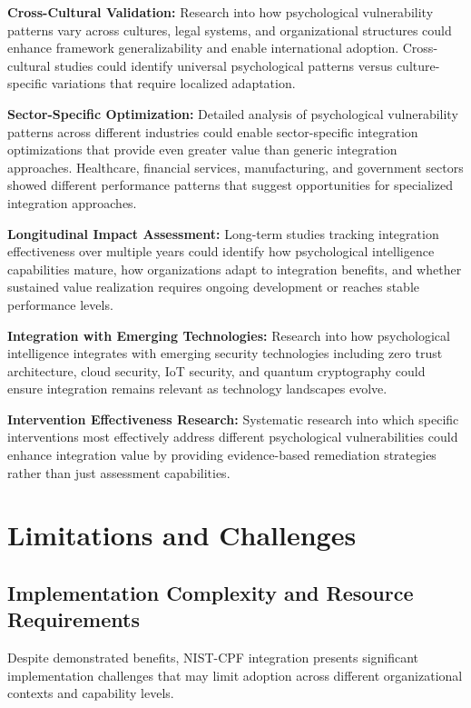 \documentclass[10pt, twocolumn]{article}
\begin{document}
\textbf{Cross-Cultural Validation:} Research into how psychological vulnerability patterns vary across cultures, legal systems, and organizational structures could enhance framework generalizability and enable international adoption. Cross-cultural studies could identify universal psychological patterns versus culture-specific variations that require localized adaptation.

\textbf{Sector-Specific Optimization:} Detailed analysis of psychological vulnerability patterns across different industries could enable sector-specific integration optimizations that provide even greater value than generic integration approaches. Healthcare, financial services, manufacturing, and government sectors showed different performance patterns that suggest opportunities for specialized integration approaches.

\textbf{Longitudinal Impact Assessment:} Long-term studies tracking integration effectiveness over multiple years could identify how psychological intelligence capabilities mature, how organizations adapt to integration benefits, and whether sustained value realization requires ongoing development or reaches stable performance levels.

\textbf{Integration with Emerging Technologies:} Research into how psychological intelligence integrates with emerging security technologies including zero trust architecture, cloud security, IoT security, and quantum cryptography could ensure integration remains relevant as technology landscapes evolve.

\textbf{Intervention Effectiveness Research:} Systematic research into which specific interventions most effectively address different psychological vulnerabilities could enhance integration value by providing evidence-based remediation strategies rather than just assessment capabilities.

\section{Limitations and Challenges}

\subsection{Implementation Complexity and Resource Requirements}

Despite demonstrated benefits, NIST-CPF integration presents significant implementation challenges that may limit adoption across different organizational contexts and capability levels.
\end{document}
